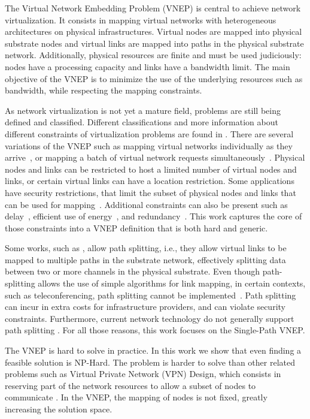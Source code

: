 \documentclass[conference]{IEEEtran}
\begin{document}
The Virtual Network Embedding Problem (VNEP) is central to achieve network virtualization. 
It consists in mapping virtual networks with heterogeneous architectures on physical infrastructures. 
Virtual nodes are mapped into physical substrate nodes and virtual links are mapped into paths in the physical substrate network. 
Additionally, physical resources are finite and must be used judiciously: nodes have a processing capacity and links have a bandwidth limit.
The main objective of the VNEP is to minimize the use of the underlying resources such as bandwidth, while respecting the mapping constraints.

As network virtualization is not yet a mature field, problems are still being defined and classified.
Different classifications and more information about different constraints of virtualization problems are found in \cite{Fischer:2011,Chowdhury2010,FischerSurvey}.
There are several variations of the VNEP such as mapping virtual networks individually as they arrive~\cite{Chowdhury2010}, or mapping a batch of virtual network requests simultaneously~\cite{Houidi:2011,Guerzoni:2014}.
Physical nodes and links can be restricted to host a limited number of virtual nodes and links, or certain virtual links can have a location restriction.
Some applications have security restrictions, that limit the subset of physical nodes and links that can be used for mapping~\cite{Buriol:2012}.
Additional constraints can also be present such as delay~\cite{infuhr:2011}, efficient use of energy~\cite{Botero:2012}, and redundancy~\cite{Shamsi:2008}. 
This work captures the core of those constraints into a VNEP definition that is both hard and generic.

Some works, such as \cite{Yu2008,hu:2013}, allow path splitting, i.e., they allow virtual links to be mapped to multiple paths in the substrate network, effectively splitting data between two or more channels in the physical substrate.
Even though path-splitting allows the use of simple algorithms for link mapping, in certain contexts, such as teleconferencing, path splitting cannot be implemented~\cite{Barnhart:2000}.
Path splitting can incur in extra costs for infrastructure providers, and can violate security constraints.
Furthermore, current network technology do not generally support path splitting \cite{Guerzoni:2014}.
For all those reasons, this work focuses on the Single-Path VNEP.

The VNEP is hard to solve in practice. In this work we show that even finding a feasible solution is NP-Hard. 
The problem is harder to solve than other related problems such as Virtual Private Network (VPN) Design, which consists in reserving part of the network resources to allow a subset of nodes to communicate \cite{Gupta:2001}.
In the VNEP, the mapping of nodes is not fixed, greatly increasing the solution space.
\end{document}
